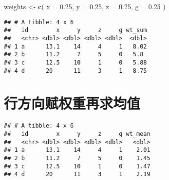 \documentclass[
]{krantz}
\makeatletter
\newenvironment{Shaded}{\begin{snugshade}}{\end{snugshade}}
\newcommand{\DataTypeTok}[1]{\textcolor[rgb]{0.27,0.27,0.27}{#1}}
\newcommand{\FloatTok}[1]{\textcolor[rgb]{0.06,0.06,0.06}{#1}}
\newcommand{\KeywordTok}[1]{\textcolor[rgb]{0.27,0.27,0.27}{\textbf{#1}}}
\newcommand{\NormalTok}[1]{#1}
\newcommand{\OperatorTok}[1]{\textcolor[rgb]{0.43,0.43,0.43}{\textbf{#1}}}
\newcommand{\StringTok}[1]{\textcolor[rgb]{0.5,0.5,0.5}{#1}}
\newenvironment{kframe}{%
\medskip{}
\setlength{\fboxsep}{.8em}
 \def\at@end@of@kframe{}%
 \ifinner\ifhmode%
  \def\at@end@of@kframe{\end{minipage}}%
  \begin{minipage}{\columnwidth}%
 \fi\fi%
 \def\FrameCommand##1{\hskip\@totalleftmargin \hskip-\fboxsep
 \colorbox{shadecolor}{##1}\hskip-\fboxsep
     \hskip-\linewidth \hskip-\@totalleftmargin \hskip\columnwidth}%
 \MakeFramed {\advance\hsize-\width
   \@totalleftmargin\z@ \linewidth\hsize
   \@setminipage}}%
 {\par\unskip\endMakeFramed%
 \at@end@of@kframe}
\renewenvironment{Shaded}{\begin{kframe}}{\end{kframe}}
\makeatother
\begin{document}
\begin{Shaded}
\begin{Highlighting}[]
\NormalTok{weights <-}\StringTok{ }\KeywordTok{c}\NormalTok{(}
   \DataTypeTok{x =} \FloatTok{0.25}\NormalTok{,}
   \DataTypeTok{y =} \FloatTok{0.25}\NormalTok{,}
   \DataTypeTok{z =} \FloatTok{0.25}\NormalTok{,}
   \DataTypeTok{g =} \FloatTok{0.25}
\NormalTok{ )}
\end{Highlighting}
\end{Shaded}

\begin{Shaded}
\end{Shaded}

\begin{verbatim}
## # A tibble: 4 x 6
##   id        x     y     z     g wt_sum
##   <chr> <dbl> <dbl> <dbl> <dbl>  <dbl>
## 1 a      13.1    14     4     1   8.02
## 2 b      11.2     7     5     0   5.8 
## 3 c      12.5    10     1     0   5.88
## 4 d      20      11     3     1   8.75
\end{verbatim}

\hypertarget{ux884cux65b9ux5411ux8d4bux6743ux91cdux518dux6c42ux5747ux503c}{%
\section{行方向赋权重再求均值}\label{ux884cux65b9ux5411ux8d4bux6743ux91cdux518dux6c42ux5747ux503c}}

\begin{Shaded}
\end{Shaded}

\begin{verbatim}
## # A tibble: 4 x 6
##   id        x     y     z     g wt_mean
##   <chr> <dbl> <dbl> <dbl> <dbl>   <dbl>
## 1 a      13.1    14     4     1    2.01
## 2 b      11.2     7     5     0    1.45
## 3 c      12.5    10     1     0    1.47
## 4 d      20      11     3     1    2.19
\end{verbatim}
\end{document}
